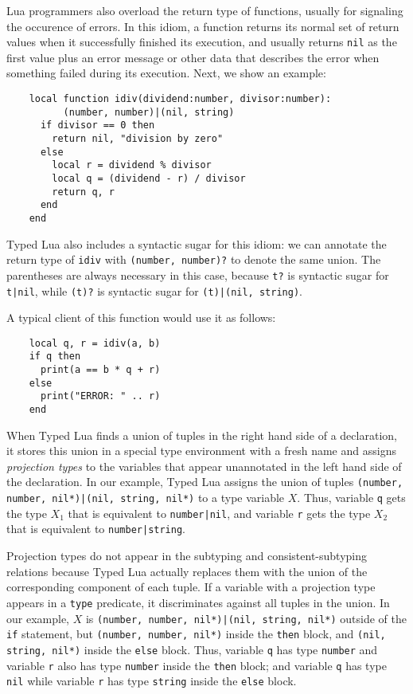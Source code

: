 Lua programmers also overload the return type of functions,
usually for signaling the occurence of errors.
In this idiom, a function returns its normal set of return values
when it successfully finished its execution,
and usually returns \texttt{nil} as the first value plus an
error message or other data that describes the error
when something failed during its execution.
Next, we show an example:
\begin{verbatim}
    local function idiv(dividend:number, divisor:number):
          (number, number)|(nil, string)
      if divisor == 0 then
        return nil, "division by zero"
      else
        local r = dividend % divisor
        local q = (dividend - r) / divisor
        return q, r
      end 
    end
\end{verbatim}

Typed Lua also includes a syntactic sugar for this idiom:
we can annotate the return type of \texttt{idiv} with
\texttt{(number, number)?} to denote the same union.
The parentheses are always necessary in this case, because
\texttt{t?} is syntactic sugar for \texttt{t|nil},
while \texttt{(t)?} is syntactic sugar for \texttt{(t)|(nil, string)}.

A typical client of this function would use it as follows:
\begin{verbatim}
    local q, r = idiv(a, b)
    if q then
      print(a == b * q + r)
    else
      print("ERROR: " .. r)
    end
\end{verbatim}

When Typed Lua finds a union of tuples in the right hand side of
a declaration, it stores this union in a special type environment
with a fresh name and assigns \emph{projection types} to the
variables that appear unannotated in the left hand side of the declaration.
In our example, Typed Lua assigns the union of tuples
\texttt{(number, number, nil*)|(nil, string, nil*)} to a type variable $X$.
Thus, variable \texttt{q} gets the type $X_{1}$
that is equivalent to \texttt{number|nil},
and variable \texttt{r} gets the type $X_{2}$
that is equivalent to \texttt{number|string}.

Projection types do not appear in the subtyping and consistent-subtyping
relations because Typed Lua actually replaces them with the union of the
corresponding component of each tuple.
If a variable with a projection type appears in a \texttt{type} predicate,
it discriminates against all tuples in the union.
In our example, $X$ is \texttt{(number, number, nil*)|(nil, string, nil*)}
outside of the \texttt{if} statement,
but \texttt{(number, number, nil*)} inside the \texttt{then} block,
and \texttt{(nil, string, nil*)} inside the \texttt{else} block.
Thus, variable \texttt{q} has type \texttt{number} and variable \texttt{r} also
has type \texttt{number} inside the \texttt{then} block;
and variable \texttt{q} has type \texttt{nil} while variable \texttt{r}
has type \texttt{string} inside the \texttt{else} block.

